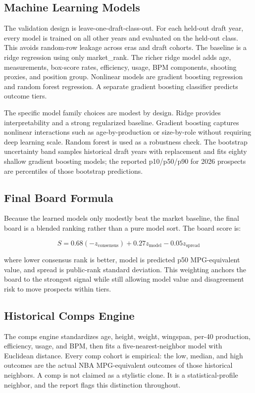 \documentclass[11pt]{article}
\begin{document}
\subsection{Machine Learning Models}

The validation design is leave-one-draft-class-out. For each held-out draft year, every model is trained on all other years and evaluated on the held-out class. This avoids random-row leakage across eras and draft cohorts. The baseline is a ridge regression using only market\_rank. The richer ridge model adds age, measurements, box-score rates, efficiency, usage, BPM components, shooting proxies, and position group. Nonlinear models are gradient boosting regression and random forest regression. A separate gradient boosting classifier predicts outcome tiers.

The specific model family choices are modest by design. Ridge provides interpretability and a strong regularized baseline. Gradient boosting captures nonlinear interactions such as age-by-production or size-by-role without requiring deep learning scale. Random forest is used as a robustness check. The bootstrap uncertainty band samples historical draft years with replacement and fits eighty shallow gradient boosting models; the reported p10/p50/p90 for 2026 prospects are percentiles of those bootstrap predictions.

\subsection{Final Board Formula}

Because the learned models only modestly beat the market baseline, the final board is a blended ranking rather than a pure model sort. The board score is:

\[ S = 0.68(-z_{\mathrm{consensus}}) + 0.27 z_{\mathrm{model}} - 0.05 z_{\mathrm{spread}} \]

where lower consensus rank is better, model is predicted p50 MPG-equivalent value, and spread is public-rank standard deviation. This weighting anchors the board to the strongest signal while still allowing model value and disagreement risk to move prospects within tiers.

\subsection{Historical Comps Engine}

The comps engine standardizes age, height, weight, wingspan, per-40 production, efficiency, usage, and BPM, then fits a five-nearest-neighbor model with Euclidean distance. Every comp cohort is empirical: the low, median, and high outcomes are the actual NBA MPG-equivalent outcomes of those historical neighbors. A comp is not claimed as a stylistic clone. It is a statistical-profile neighbor, and the report flags this distinction throughout.
\end{document}
